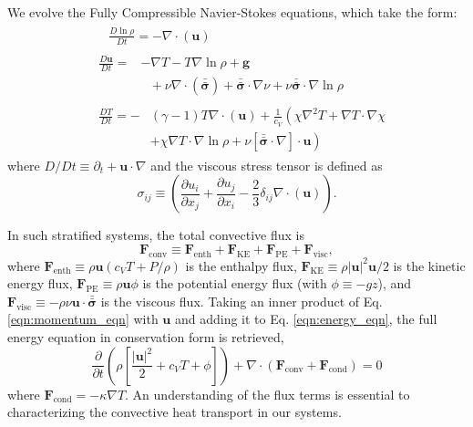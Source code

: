 \documentclass[aps, prl, twocolumn, nofootinbib, groupedaddress, amsfonts, amssymb, amsmath]{revtex4-1}
\newcommand{\Div}[1]{\ensuremath{\nabla\cdot\left( #1\right)}}
\newcommand{\grad}{\ensuremath{\nabla}}
\newcommand{\lilstressT}{\ensuremath{\bm{\bar{\bar{\sigma}}}}}
\begin{document}
We evolve the Fully Compressible Navier-Stokes equations,
which take the form:
\begin{align}
&\begin{aligned}
&\frac{D \ln\rho}{D t} = -\Div{\bm{u}}
	\label{eqn:continuity_eqn}
\end{aligned}\\
&\begin{aligned}
\frac{D\bm{u}}{D t}=
&-\grad T - T\grad\ln\rho + \bm{g} \\
&\,\,\,\,+\nu\Div{\lilstressT} + \lilstressT\cdot\grad\nu + \nu\lilstressT\cdot\grad\ln\rho
\label{eqn:momentum_eqn}
\end{aligned}\\
&\begin{aligned}
\frac{D T}{D t} = -&(\gamma-1)T\Div{\bm{u}} + \frac{1}{c_V}\left( \chi\grad^2 T + \grad T \cdot \grad\chi  \right. \\ \
&+ \chi\grad T \cdot\grad\ln\rho +\nu\left[\lilstressT\cdot\nabla\right]\cdot\bm{u}\left.\right) 
	\label{eqn:energy_eqn}
\end{aligned}
\end{align}
where $D/Dt \equiv \partial_t + \bm{u}\cdot\grad$ and the viscous stress tensor is defined as
\begin{equation}
\sigma_{ij} \equiv \left(\frac{\partial u_i}{\partial x_j} + \frac{\partial u_j}{\partial x_i} - \frac{2}{3}\delta_{ij}\Div{\bm{u}}\right).
	\label{eqn:stress_tensor}
\end{equation}

In such stratified systems, the total convective flux is
\begin{equation}
\bm{F}_{\text{conv}} \equiv \bm{F}_{\text{enth}} + \bm{F}_{\text{KE}} + \bm{F}_{\text{PE}} + \bm{F}_{\text{visc}},
\end{equation}
where $\bm{F}_{\text{enth}} \equiv \rho\bm{u}(c_V T + P/\rho)$ is the enthalpy flux, $\bm{F}_{\text{KE}} \equiv 
\rho|\bm{u}|^2\bm{u}/2$ is the kinetic energy flux, $\bm{F}_{\text{PE}} \equiv \rho\bm{u}\phi$ is the potential
energy flux (with $\phi \equiv -gz$), 
and $\bm{F}_{\text{visc}} \equiv -\rho\nu\bm{u}\cdot\lilstressT$ is the viscous flux.  Taking an inner product of
Eq. \ref{eqn:momentum_eqn} with $\bm{u}$ and adding it to 
Eq. \ref{eqn:energy_eqn}, the full energy equation in conservation form is retrieved,
\begin{equation}
\frac{\partial}{\partial t}\left(\rho\left[\frac{|\bm{u}|^2}{2} + c_V T + \phi\right]\right) +
\Div{\bm{F}_{\text{conv}} + \bm{F}_{\text{cond}}} = 0
	\label{eqn:energy_eqn_full}
\end{equation}
where $\bm{F}_{\text{cond}} = -\kappa \grad T$.  An understanding of the flux terms is essential to characterizing
the convective heat transport in our systems.
\end{document}
